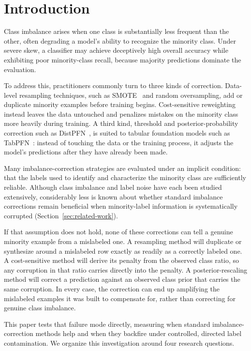 \section{Introduction}
\label{sec:introduction}

Class imbalance arises when one class is substantially less frequent than the
other, often degrading a model's ability to recognize the minority class. Under
severe skew, a classifier may achieve deceptively high overall accuracy while
exhibiting poor minority-class recall, because majority predictions dominate the
evaluation.

To address this, practitioners commonly turn to three kinds of correction.
Data-level resampling techniques, such as SMOTE~\cite{chawla2002smote} and random
oversampling, add or duplicate minority examples before training begins.
Cost-sensitive reweighting~\cite{elkan2001costsensitive} instead leaves the data
untouched and penalizes mistakes on the minority class more heavily during
training. A third kind, threshold and posterior-probability correction such as
DistPFN~\cite{lee2026distpfn}, is suited to tabular foundation models such as
TabPFN~\cite{hollmann2023tabpfn,hollmann2025tabpfnv2}: instead of touching the data
or the training process, it adjusts the model's predictions after they have
already been made.

Many imbalance-correction strategies are evaluated under an implicit condition:
that the labels used to identify and characterize the minority class are
sufficiently reliable. Although class imbalance and label noise have each been
studied extensively, considerably less is known about whether standard imbalance
corrections remain beneficial when minority-label information is systematically
corrupted (Section~\ref{sec:related-work}).

If that assumption does not hold, none of these corrections can tell a genuine
minority example from a mislabeled one. A resampling method will duplicate or
synthesize around a mislabeled row exactly as readily as a correctly labeled one. A
cost-sensitive method will derive its penalty from the observed class ratio, so any
corruption in that ratio carries directly into the penalty. A posterior-rescaling
method will correct a prediction against an observed class prior that carries the
same corruption. In every case, the correction can end up amplifying the
mislabeled examples it was built to compensate for, rather than correcting for
genuine class imbalance.

This paper tests that failure mode directly, measuring when standard
imbalance-correction methods help and when they backfire under controlled, directed
label contamination. We organize this investigation around four research
questions.

